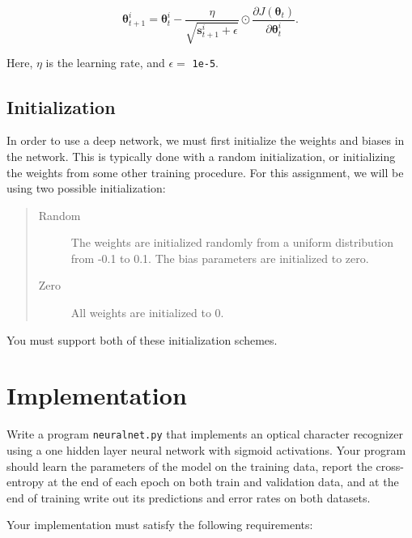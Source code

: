 \documentclass[11pt,addpoints,answers]{exam}
\newcommand{\sv}{\mathbf{s}}
\newcommand{\thetav     }{\boldsymbol \theta     }
\begin{document}
\begin{equation}
    \label{eq:adagrad_update}
    \thetav^i_{t+1} = \thetav^i_t - \frac{\eta}{\sqrt{\sv^i_{t+1} + \epsilon}} \odot \frac{\partial J(\thetav_t)}{ \partial \thetav^i_t}.
\end{equation}

Here, $\eta$ is the learning rate, and $\epsilon =$ \texttt{1e-5}. \\

\subsection{Initialization}
\label{sec:init}

In order to use a deep network, we must first initialize the weights and biases in the network. This is typically done with a random initialization, or initializing the weights from some other training procedure. For this assignment, we will be using two possible initialization: 
\begin{quote}
\begin{description}
\item[{\sc Random}] The weights are initialized randomly from a uniform distribution from -0.1 to 0.1. The bias parameters are initialized to zero.
\item[{\sc Zero}] All weights are initialized to 0.  
\end{description}
\end{quote}

You must support both of these initialization schemes.

\section{Implementation}

Write a program \texttt{neuralnet.py} that implements an optical character recognizer using a one hidden layer neural network with sigmoid activations. Your program should learn the parameters of the model on the training data, report the cross-entropy at the end of each epoch on both train and validation data, and at the end of training write out its predictions and error rates on both datasets. 
%

Your implementation must satisfy the following requirements:
\end{document}
